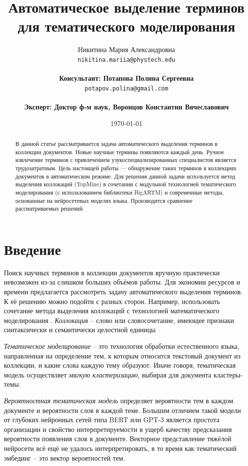 \documentclass[a4paper, 12pt]{article}
\title{Автоматическое выделение терминов для тематического моделирования}
\author{
	  Никитина Мария Александровна\\
	\texttt{nikitina.mariia@phystech.edu} \\
 \\
        \textbf{Консультант: Потапова Полина Сергеевна} \\
	\texttt{potapov.polina@gmail.com} \\
 \\
        \textbf{Эксперт: Доктор ф-м наук, Воронцов Константин Вячеславович} \\
}
\date{\today}
\begin{document}
\maketitle

\begin{abstract}
В данной статье рассматривается задача автоматического выделения терминов в коллекции документов. Новые научные термины появляются каждый день.
Ручное извлечение терминов с привлечением узукоспециализированных
специалистов является трудозатратным. Цель настоящей работы --- обнаружение таких терминов в коллекциях документов в автоматическом режиме. Для решения данной задачи используется метод выделения коллокаций (TopMine) в сочетании с модульной технологией тематического моделирования (с использованием библиотеки BigARTM) и современные методы, основанные на нейросетевых моделях языка. Производится сравнение рассматриваемых решений.
\end{abstract}


\section{Введение}

        Поиск научных терминов в коллекции документов вручную практически невозможен из-за слишком больших объёмов работы. Для экономии ресурсов и времени предлагается рассмотреть задачу автоматического выделения терминов. К её решению можно подойти с разных сторон. Например, использовать сочетание метода выделения коллокаций с технологией математического моделирования \citep{ElKishky2014}. \textit{Коллокация} -- слово или словосочетание, имеющее признаки синтаксически и семантически целостной единицы

        \textit{Тематическое моделирование} -- это технология обработки естественного языка, направленная на определение тем, к которым относится текстовый документ из коллекции, и какие слова каждую тему образуют. Иначе говоря, тематическая модель осуществляет \textit{мягкую кластеризацию}, выбирая для документа кластеры-темы.

        \textit{Вероятностная тематическая модель} определяет вероятности тем в каждом документе и вероятности слов в каждой теме. Большим отличием такой модели от глубоких нейронных сетей типа BERT \citep{bert} или GPT-3 \citep{Brown2020LanguageMA} является простота организации и свойство интерпретируемости в ущерб качеству предсказания вероятности появления слов в документе. Векторное представление тяжёлой нейросети всё ещё не удалось интерпретировать, в то время как тематический эмбединг -- это вектор вероятностей тем.
\end{document}
